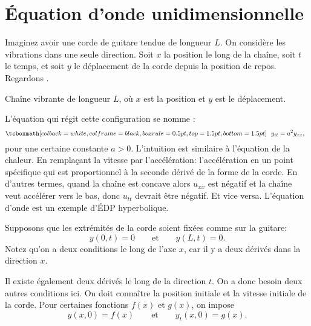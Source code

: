 
\sectionnewpage
\section{Équation d'onde unidimensionnelle} \label{we:section}

%
Imaginez avoir une corde de guitare tendue de longueur $ L $.  On considère les vibrations dans une seule direction.  
Soit $ x $  la position le long de la chaîne,  soit $ t $ le temps,  et soit $ y $ le déplacement de la corde depuis la position de repos.
Regardons
.

\begin{myfig}
\capstart
{}
\caption{Chaîne vibrante de longueur $ L $,  où $ x $ est la position et $ y $ est le déplacement.\label{we:vibstrfig}}
\end{myfig}

L'équation qui régit cette configuration se nomme
\emph{}:
\begin{equation*}
\mybxbg{~~
y_{tt} =
a^2 y_{xx} ,
~~}
\end{equation*}
pour une certaine constante $a > 0$.
L'intuition est similaire à l'équation de la chaleur. En remplaçant la vitesse par
l'accélération: l'accélération en un point spécifique qui est proportionnel à la seconde
dérivé de la forme de la corde.  En d'autres termes,
quand la chaîne est
concave alors $u_{xx}$ est négatif et la chaîne veut accélérer
vers le bas,  donc $u_{tt}$ devrait être négatif.  Et vice versa.
L'équation d'onde est un exemple d'ÉDP hyperbolique.

Supposons que les extrémités de la corde soient fixées comme sur la guitare:
\begin{equation*}
y(0,t) = 0 \qquad \text{et} \qquad y(L,t) = 0.
\end{equation*}
Notez qu'on a deux conditions le long de l'axe $ x $, car il y a
deux dérivés dans la direction $ x $.

Il existe également deux dérivés le long de la direction $ t $.  On a donc besoin
deux autres conditions ici.  On doit connaître la position initiale
et la vitesse initiale de la corde.  Pour certaines fonctions $ f (x) $ et $ g (x) $, on impose
\begin{equation*}
y(x,0) = f(x)  \qquad \text{et} \qquad y_t (x,0) =
g(x) .
\end{equation*}


